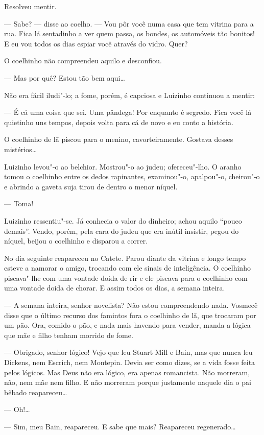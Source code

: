 Resolveu mentir.

--- Sabe? --- disse ao coelho. --- Vou pôr você numa casa que tem
vitrina para a rua. Fica lá sentadinho a ver quem passa, os bondes, os
automóveis tão bonitos! E eu vou todos os dias espiar você através do
vidro. Quer?

O coelhinho não compreendeu aquilo e desconfiou.

--- Mas por quê? Estou tão bem aqui\ldots{}

Não era fácil iludi"-lo; a fome, porém, é capciosa e Luizinho continuou a
mentir:

--- É cá uma coisa que sei. Uma pândega! Por enquanto é segredo. Fica
você lá quietinho uns tempos, depois volta para cá de novo e eu conto a
história.

O coelhinho de lã piscou para o menino, cavorteiramente. Gostava desses
mistérios\ldots{}

Luizinho levou"-o ao belchior. Mostrou"-o ao judeu; ofereceu"-lho. O aranho
tomou o coelhinho entre os dedos rapinantes, examinou"-o, apalpou"-o,
cheirou"-o e abrindo a gaveta suja tirou de dentro o menor níquel.

--- Toma!

Luizinho ressentiu"-se. Já conhecia o valor do dinheiro; achou aquilo
``pouco demais''. Vendo, porém, pela cara do judeu que era inútil
insistir, pegou do níquel, beijou o coelhinho e disparou a correr.

No dia seguinte reapareceu no Catete. Parou diante da vitrina e longo
tempo esteve a namorar o amigo, trocando com ele sinais de inteligência.
O coelhinho piscava"-lhe com uma vontade doida de rir e ele piscava para
o coelhinho com uma vontade doida de chorar. E assim todos os dias, a
semana inteira.

--- A semana inteira, senhor novelista? Não estou compreendendo nada.
Vosmecê disse que o último recurso dos famintos fora o coelhinho de lã,
que trocaram por um pão. Ora, comido o pão, e nada mais havendo para
vender, manda a lógica que mãe e filho tenham morrido de fome.

--- Obrigado, senhor lógico! Vejo que leu Stuart Mill e Bain, mas que
nunca leu Dickens, nem Escrich, nem Montepin. Devia ser como dizes, se a
vida fosse feita pelos lógicos. Mas Deus não era lógico, era apenas
romancista. Não morreram, não, nem mãe nem filho. E não morreram porque
justamente naquele dia o pai bêbado reapareceu\ldots{}

--- Oh!\ldots{}

--- Sim, meu Bain, reapareceu. E sabe que mais? Reapareceu regenerado\ldots{}

